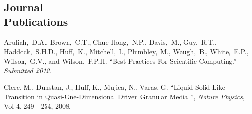 \documentclass[margin,line]{resume}
\begin{document}
\begin{resume}
    \section{\mysidestyle Journal\\Publications}
      \begin{bibenum}
        \item Aruliah,~D.A., Brown,~C.T., Chue Hong,~N.P., Davis,~M., Guy,~R.T., 
          Haddock,~S.H.D., Huff,~K., Mitchell,~I., Plumbley,~M., Waugh,~B., 
          White,~E.P., Wilson,~G.V., and Wilson,~P.P.H.  ``Best Practices For 
          Scientific Computing.''  \emph{Submitted 2012.} 
        \item Clerc, M., Dunstan, J., Huff, K., Mujica, N., Varas, G. 
          ``Liquid-Solid-Like Transition in Quasi-One-Dimensional Driven 
          Granular Media '',  \textsl{Nature Physics}, Vol 4, 249 - 254, 2008.
      \end{bibenum}

\end{resume}
\end{document}

